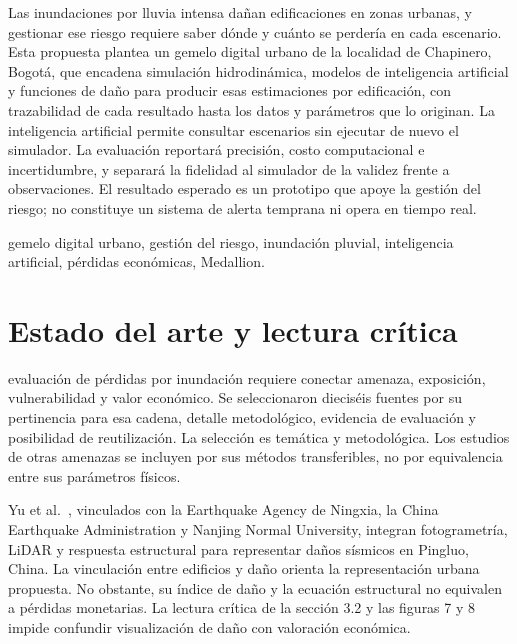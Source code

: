 \documentclass[journal]{IEEEtran}
\begin{document}
\begingroup
\renewcommand{\IEEEkeywordsname}{Declaración de impacto}
\begin{IEEEkeywords}
Las inundaciones por lluvia intensa dañan edificaciones en zonas urbanas, y gestionar ese riesgo requiere saber dónde y cuánto se perdería en cada escenario. Esta propuesta plantea un gemelo digital urbano de la localidad de Chapinero, Bogotá, que encadena simulación hidrodinámica, modelos de inteligencia artificial y funciones de daño para producir esas estimaciones por edificación, con trazabilidad de cada resultado hasta los datos y parámetros que lo originan. La inteligencia artificial permite consultar escenarios sin ejecutar de nuevo el simulador. La evaluación reportará precisión, costo computacional e incertidumbre, y separará la fidelidad al simulador de la validez frente a observaciones. El resultado esperado es un prototipo que apoye la gestión del riesgo; no constituye un sistema de alerta temprana ni opera en tiempo real.
\end{IEEEkeywords}
\endgroup

\begin{IEEEkeywords}
gemelo digital urbano, gestión del riesgo, inundación pluvial, inteligencia artificial, pérdidas económicas, Medallion.
\end{IEEEkeywords}

\section{Estado del arte y lectura crítica}

 evaluación de pérdidas por inundación requiere conectar amenaza, exposición, vulnerabilidad y valor económico. Se seleccionaron dieciséis fuentes por su pertinencia para esa cadena, detalle metodológico, evidencia de evaluación y posibilidad de reutilización. La selección es temática y metodológica. Los estudios de otras amenazas se incluyen por sus métodos transferibles, no por equivalencia entre sus parámetros físicos.

Yu et al.~\cite{yu2023}, vinculados con la Earthquake Agency de Ningxia, la China Earthquake Administration y Nanjing Normal University, integran fotogrametría, LiDAR y respuesta estructural para representar daños sísmicos en Pingluo, China. La vinculación entre edificios y daño orienta la representación urbana propuesta. No obstante, su índice de daño y la ecuación estructural no equivalen a pérdidas monetarias. La lectura crítica de la sección 3.2 y las figuras 7 y 8 impide confundir visualización de daño con valoración económica.
\end{document}
